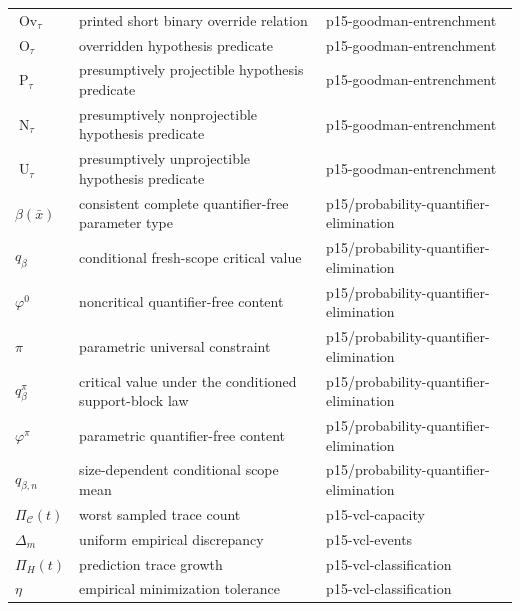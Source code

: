 \begin{longtable}{@{}p{}p{}p{}@{}}
\(\operatorname{Ov}_\tau\) & printed short binary override relation & p15-\allowbreak{}goodman-\allowbreak{}entrenchment \\
\(\operatorname{O}_\tau\) & overridden hypothesis predicate & p15-\allowbreak{}goodman-\allowbreak{}entrenchment \\
\(\operatorname{P}_\tau\) & presumptively projectible hypothesis predicate & p15-\allowbreak{}goodman-\allowbreak{}entrenchment \\
\(\operatorname{N}_\tau\) & presumptively nonprojectible hypothesis predicate & p15-\allowbreak{}goodman-\allowbreak{}entrenchment \\
\(\operatorname{U}_\tau\) & presumptively unprojectible hypothesis predicate & p15-\allowbreak{}goodman-\allowbreak{}entrenchment \\
\(\beta(\bar x)\) & consistent complete quantifier-free parameter type & p15/\allowbreak{}probability-\allowbreak{}quantifier-\allowbreak{}elimination \\
\(q_\beta\) & conditional fresh-scope critical value & p15/\allowbreak{}probability-\allowbreak{}quantifier-\allowbreak{}elimination \\
\(\varphi^0\) & noncritical quantifier-free content & p15/\allowbreak{}probability-\allowbreak{}quantifier-\allowbreak{}elimination \\
\(\pi\) & parametric universal constraint & p15/\allowbreak{}probability-\allowbreak{}quantifier-\allowbreak{}elimination \\
\(q_\beta^\pi\) & critical value under the conditioned support-block law & p15/\allowbreak{}probability-\allowbreak{}quantifier-\allowbreak{}elimination \\
\(\varphi^\pi\) & parametric quantifier-free content & p15/\allowbreak{}probability-\allowbreak{}quantifier-\allowbreak{}elimination \\
\(q_{\beta,n}\) & size-dependent conditional scope mean & p15/\allowbreak{}probability-\allowbreak{}quantifier-\allowbreak{}elimination \\
\(\Pi_{\mathcal C}(t)\) & worst sampled trace count & p15-\allowbreak{}vcl-\allowbreak{}capacity \\
\(\Delta_m\) & uniform empirical discrepancy & p15-\allowbreak{}vcl-\allowbreak{}events \\
\(\Pi_H(t)\) & prediction trace growth & p15-\allowbreak{}vcl-\allowbreak{}classification \\
\(\eta\) & empirical minimization tolerance & p15-\allowbreak{}vcl-\allowbreak{}classification \\

\end{longtable}
